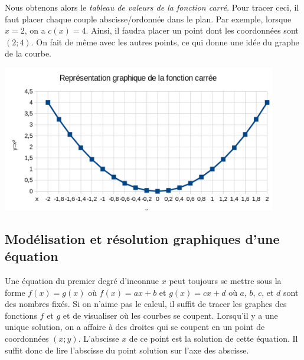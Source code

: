 			Nous obtenons alors le \emph{tableau de valeurs de la fonction carré}. Pour tracer ceci, il faut placer chaque couple abscisse/ordonnée dans le plan. Par exemple, lorsque $x=2$, on a $c(x)=4$. Ainsi, il faudra placer un point dont les coordonnées sont $(2;4)$. On fait de même avec les autres points, ce qui donne une idée du graphe de la courbe.

			\includegraphics[width=0.9\textwidth]{image/calcul/courbe_fct_car.png}

		\subsection{Modélisation et résolution graphiques d'une équation}

			Une équation du premier degré d'inconnue $x$ peut toujours se mettre sous la forme $f(x)=g(x)$ où $f(x)=ax+b$ et $g(x)=cx+d$ où $a$, $b$, $c$, et $d$ sont des nombres fixés. Si on n'aime pas le calcul, il suffit de tracer les graphes des fonctions $f$ et $g$ et de visualiser où les courbes se coupent. Lorsqu'il y a une unique solution, on a affaire à des droites qui se coupent en un point de coordonnées $(x;y)$. L'abscisse $x$ de ce point est la solution de cette équation. Il suffit donc de lire l'abscisse du point solution sur l'axe des abscisse.

